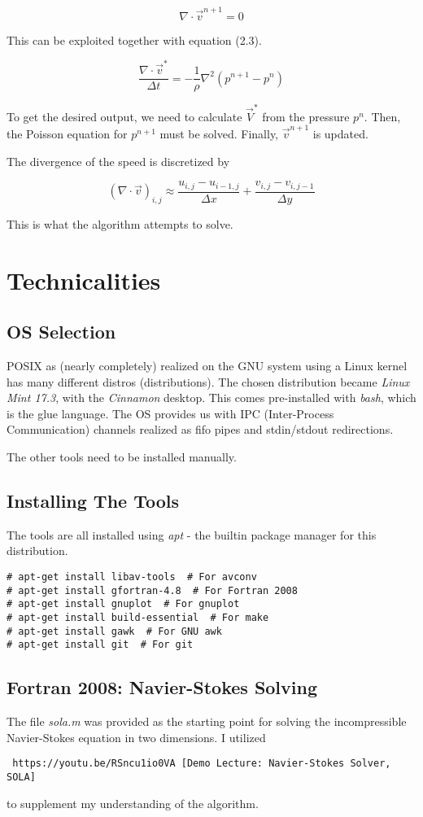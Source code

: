 \documentclass[listof=totoc]{report}
\begin{document}
$$ \nabla \cdot \vec{v}^{n+1} = 0 $$

This can be exploited together with equation (2.3).

\begin{equation}
\frac{\nabla \cdot \vec{v}^*}{\Delta t} = -\frac{1}{\rho} \nabla^2 (p^{n+1} - p^{n})
\end{equation}

To get the desired output, we need to calculate $\vec{V}^*$ from the pressure $p^n$.
Then, the Poisson equation for $p^{n+1}$ must be solved.
Finally, $\vec{v}^{n+1}$ is updated.

The divergence of the speed is discretized by

$$ (\nabla \cdot \vec{v})_{i,j} \approx \frac{u_{i,j} - u_{i-1,j}}{\Delta x} + \frac{v_{i,j} - v_{i,j-1}}{\Delta y} $$

This is what the algorithm attempts to solve.


\chapter{Technicalities}
\section{OS Selection}
POSIX as (nearly completely) realized on the GNU system using a Linux kernel has many different distros (distributions). The chosen distribution became \emph{Linux Mint 17.3}, with the \emph{Cinnamon} desktop. This comes pre-installed with \emph{bash}, which is the glue language. The OS provides us with IPC (Inter-Process Communication) channels realized as fifo pipes and stdin/stdout redirections.

The other tools need to be installed manually.

\section{Installing The Tools}
The tools are all installed using \emph{apt} - the builtin package manager for this distribution.

\begin{verbatim}
# apt-get install libav-tools  # For avconv
# apt-get install gfortran-4.8  # For Fortran 2008
# apt-get install gnuplot  # For gnuplot
# apt-get install build-essential  # For make
# apt-get install gawk  # For GNU awk
# apt-get install git  # For git
\end{verbatim}

\section{Fortran 2008: Navier-Stokes Solving}
The file \emph{sola.m} was provided as the starting point for solving the incompressible Navier-Stokes equation in two dimensions.
I utilized \begin{verbatim} https://youtu.be/RSncu1io0VA [Demo Lecture: Navier-Stokes Solver, SOLA] \end{verbatim} to supplement my understanding of the algorithm.
\end{document}
